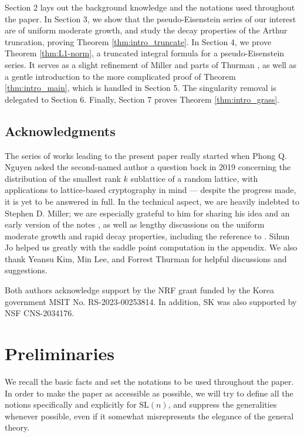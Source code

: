 \documentclass[11pt]{amsart}
\numberwithin{theorem}{section}
\numberwithin{equation}{section}
\theoremstyle{remark}
\theoremstyle{definition}
\newcommand{\SL}{\mathrm{SL}}
\begin{document}
Section 2 lays out the background knowledge and the notations used throughout the paper. In Section 3, we show that the pseudo-Eisenstein series of our interest are of uniform moderate growth, and study the decay properties of the Arthur truncation, proving Theorem \ref{thm:intro_truncate}. In Section 4, we prove Theorem \ref{thm:L1-norm}, a truncated integral formula for a pseudo-Eisenstein series. It serves as a slight refinement of Miller \cite{Mil20} and parts of Thurman \cite{Thu24}, as well as a gentle introduction to the more complicated proof of Theorem \ref{thm:intro_main}, which is handled in Section 5. The singularity removal is delegated to Section 6. Finally, Section 7 proves Theorem \ref{thm:intro_grass}.

\subsection{Acknowledgments}

The series of works \cite{Kim22,Kim23} leading to the present paper really started when Phong Q. Nguyen asked the second-named author a question back in 2019 concerning the distribution of the smallest rank $k$ sublattice of a random lattice, with applications to lattice-based cryptography in mind --- despite the progress made, it is yet to be answered in full. In the technical aspect, we are heavily indebted to Stephen D. Miller; we are especially grateful to him for sharing his idea and an early version of the notes \cite{Mil20}, as well as lengthy discussions on the uniform moderate growth and rapid decay properties, including the reference to \cite{GMP17}. Sihun Jo helped us greatly with the saddle point computation in the appendix. We also thank Yeansu Kim, Min Lee, and Forrest Thurman for helpful discussions and suggestions.

Both authors acknowledge support by the NRF grant funded by the Korea government MSIT No. RS-2023-00253814. In addition, SK was also supported by NSF CNS-2034176.



\section{Preliminaries}

We recall the basic facts and set the notations to be used throughout the paper. In order to make the paper as accessible as possible, we will try to define all the notions specifically and explicitly for $\SL(n)$, and suppress the generalities whenever possible, even if it somewhat misrepresents the elegance of the general theory.
\end{document}
